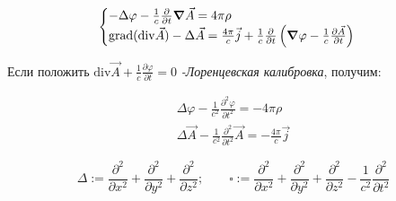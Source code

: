 \[
\begin{cases}
    -\Delta\varphi-\frac{1}{c}\frac{\partial}{\partial t}\grad \vec{A}=4\pi\rho \\
    \mathrm{grad }(\mathrm{div} \vec{A})-\Delta \vec{A} =\frac{4\pi}{c}\vec{j}+\frac{1}{c}  \frac{\partial }{\partial t} \left( \grad\varphi -\frac{1}{c} \frac{\partial \vec{A}}{\partial t}  \right)   
\end{cases}
\]

Если положить \( \mathrm{div}\vec{A}+\frac{1}{c} \frac{\partial\varphi}{\partial t}=0    \) \textit{-Лоренцевская калибровка}, получим:

\begin{gather*}
    \Delta\varphi-\frac{1}{c^2} \frac{\partial^2\varphi}{\partial t^2} =-4\pi\rho \\
    \Delta\vec{A}-\frac{1}{c^2} \frac{\partial^2}{\partial t^2}\vec{A}=-\frac{4\pi}{c}\vec{j}    
\end{gather*}

\[
\Delta:= \frac{\partial^2}{\partial x^2}+\frac{\partial^2}{\partial y^2} +\frac{\partial^2}{\partial z^2} ;\qquad \square :=\frac{\partial^2}{\partial x^2}+\frac{\partial^2}{\partial y^2} +\frac{\partial^2}{\partial z^2}-\frac{1}{c^2} \frac{\partial^2}{\partial t^2}
\]